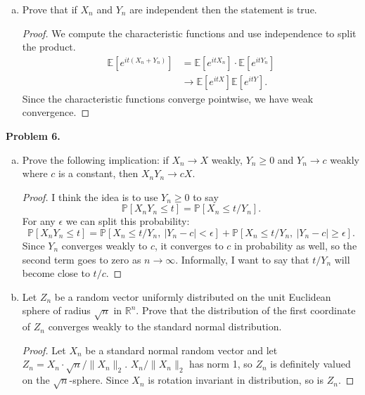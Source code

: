 \documentclass[11pt,letterpaper]{report}
\newcommand{\reals}{\mathbb{R}}
\newcommand{\E}{\mathbb{E}}
\newcommand{\Prob}{\mathbb{P}}
\begin{document}
\begin{enumerate}[(a)]
	\item Prove that if $X_n$ and $Y_n$ are independent then the statement is true.
	\begin{proof}
		We compute the characteristic functions and use independence to split the product.
		\begin{align*}
			\E\left[e^{it(X_n+Y_n)}\right] &= \E\left[ e^{itX_n}\right]\cdot \E\left[e^{itY_n}\right]\\
			&\to \E\left[e^{itX}\right]\E\left[e^{itY}\right].
		\end{align*}
		Since the characteristic functions converge pointwise, we have weak convergence.
	\end{proof}
\end{enumerate}

\noindent\textbf{Problem 6. }
\begin{enumerate}[(a)]
	\item Prove the following implication: if $X_n\to X$ weakly, $Y_n\geq 0$ and $Y_n\to c$ weakly where $c$ is a constant, then $X_nY_n\to cX$.
	\begin{proof}
		I think the idea is to use $Y_n\geq 0$ to say
		\[
		\Prob[X_nY_n \leq t] = \Prob[X_n \leq t/Y_n].
		\]
		For any $\epsilon$ we can split this probability:
		\[
		\Prob[X_nY_n\leq t] = \Prob[X_n \leq t/Y_n,\ |Y_n-c|<\epsilon] + \Prob[X_n \leq t/Y_n,\ |Y_n-c|\geq \epsilon].
		\]
		Since $Y_n$ converges weakly to $c$, it converges to $c$ in probability as well, so the second term goes to zero as $n\to \infty$. Informally, I want to say that $t/Y_n$ will become close to $t/c$.
	\end{proof}

	\item Let $Z_n$ be a random vector uniformly distributed on the unit Euclidean sphere of radius $\sqrt{n}$ in $\reals^n$. Prove that the distribution of the first coordinate of $Z_n$ converges weakly to the standard normal distribution.
	\begin{proof}
		Let $X_n$ be a standard normal random vector and let $Z_n = X_n\cdot \sqrt{n}/\|X_n\|_2$. $X_n/\|X_n\|_2$ has norm 1, so $Z_n$ is definitely valued on the $\sqrt{n}$-sphere. Since $X_n$ is rotation invariant in distribution, so is $Z_n$. 
	\end{proof}
\end{enumerate}
\end{document}
